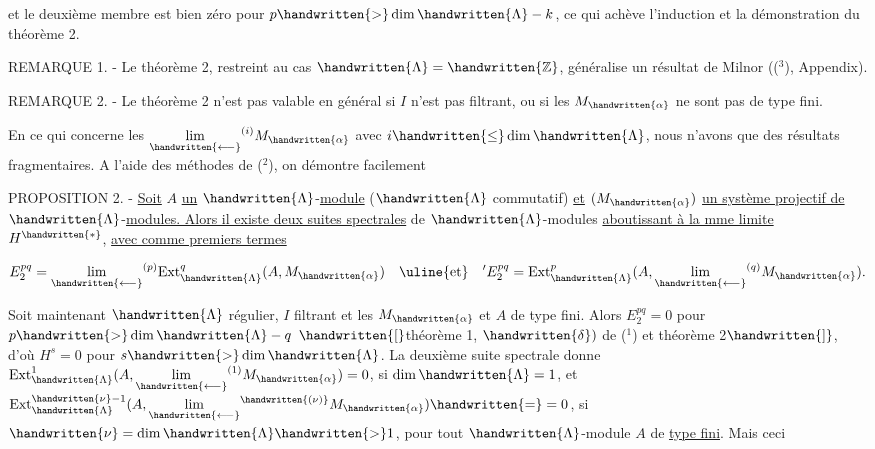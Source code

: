 et le  deuxième membre est bien zéro pour $p\handwritten{>}\dim \handwritten{\Lambda}-k$, ce qui achève l'induction et la démonstration du théorème 2.

REMARQUE 1. - Le théorème 2, restreint au cas $\handwritten{\Lambda}=\handwritten{\mathbb{Z}}$, généralise un résultat de Milnor (($^{3}$), Appendix).

REMARQUE 2. - Le théorème 2 n'est pas valable en général si $I$ n'est pas filtrant, ou si les $M_{\handwritten{\alpha}}$ ne sont pas de type fini.

\margin{\handwritten{$\checkmark$}}

En ce qui concerne les $\underset{\handwritten{\longleftarrow}}{\lim}^{(i)}M_{\handwritten{\alpha}}$ avec $i\handwritten{\leq}\dim \handwritten{\Lambda}$, nous n'avons que des résultats fragmentaires. A l'aide des méthodes de ($^{2}$), on démontre facilement


PROPOSITION 2. - \uline{Soit} $A$ \uline{un} $\handwritten{\Lambda}$-\uline{module} ($\handwritten{\Lambda}$ commutatif) \uline{et} $(M_{\handwritten{\alpha}})$ \uline{un système projectif de} $\handwritten{\Lambda}$-\uline{modules. Alors il existe deux suites spectrales} de $\handwritten{\Lambda}$-modules \uline{aboutissant à la mme limite} $H^{\handwritten{*}}$, \uline{avec comme premiers termes}

\[ E_2^{pq}=\underset{\handwritten{\longleftarrow}}{\lim}^{(p)}\mathrm{Ext}_{\handwritten{\Lambda}}^{q}(A,M_{\handwritten{\alpha}})\quad\text{\uline{et}}\quad {}'E_2^{pq}=\mathrm{Ext}_{\handwritten{\Lambda}}^{p}(A,\underset{\handwritten{\longleftarrow}}{\lim}^{(q)}M_{\handwritten{\alpha}}). \]

Soit maintenant $\handwritten{\Lambda}$ régulier, $I$ filtrant et les $M_{\handwritten{\alpha}}$ et $A$ de type fini. Alors $E_2^{pq}=0$ pour $p\handwritten{>}\dim \handwritten{\Lambda}-q$ $\handwritten{[}$théorème 1, $\handwritten{\delta})$ de ($^{1}$) et théorème 2$\handwritten{]}$, d'où $H^s=0$ pour $s\handwritten{>}\dim \handwritten{\Lambda}$. La deuxième suite spectrale donne $\mathrm{Ext}_{\handwritten{\Lambda}}^{1}(A,\underset{\handwritten{\longleftarrow}}{\lim}^{(1)}M_{\handwritten{\alpha}})=0$, si $\dim \handwritten{\Lambda}=1$, et $\mathrm{Ext}_{\handwritten{\Lambda}}^{\handwritten{\nu}-1}(A,\underset{\handwritten{\longleftarrow}}{\lim}^{\handwritten{(\nu)}}M_{\handwritten{\alpha}})\handwritten{=}=0$, si $\handwritten{\nu}=\dim \handwritten{\Lambda}\handwritten{>}1$, pour tout $\handwritten{\Lambda}$-module $A$ de \uline{type fini}. Mais ceci

